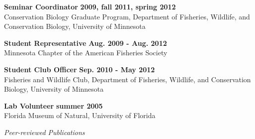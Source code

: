 \documentclass[letterpaper,12pt]{article}
\newcommand{\sectitle}[1]{\vspace{\baselineskip} \centerline{\large{\textit{#1}}}}
\begin{document}
{\bf Seminar Coordinator} \hfill {\bf 2009, fall 2011, spring 2012} \\
Conservation Biology Graduate Program, Department of Fisheries, Wildlife, and Conservation Biology, University of Minnesota

{\bf Student Representative} \hfill {\bf Aug. 2009 - Aug. 2012} \\
Minnesota Chapter of the American Fisheries Society

{\bf Student Club Officer} \hfill {\bf Sep. 2010 - May 2012} \\
Fisheries and Wildlife Club, Department of Fisheries, Wildlife, and Conservation Biology, University of Minnesota 

{\bf Lab Volunteer} \hfill {\bf summer 2005} \\
Florida Museum of Natural, University of Florida

\sectitle{Peer-reviewed Publications}
\end{document}
